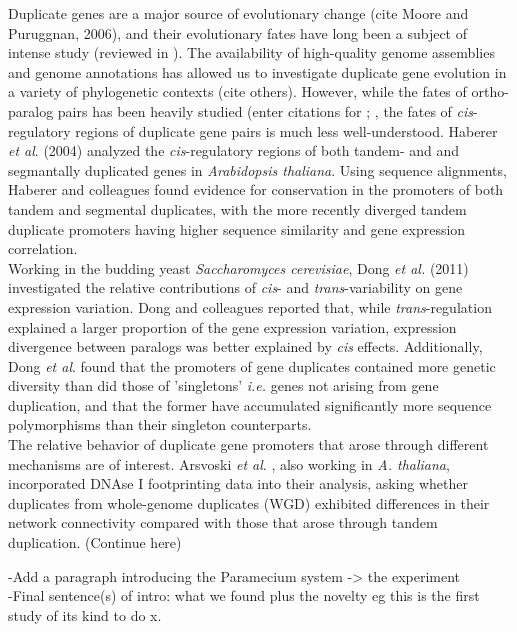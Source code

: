 \documentclass[nogrid]{MBE}%
\begin{document}
Duplicate genes are a major source of evolutionary change (cite \citep{Ohno.1970} Moore and Puruggnan, 2006), and their evolutionary fates have long been a subject of intense study (reviewed in \citep{Taylor.2004}). The availability of high-quality genome assemblies and genome annotations has allowed us to investigate duplicate gene evolution in a variety of phylogenetic contexts  \citep{Gu.2003} (cite others). However, while the fates of ortho-paralog pairs has been heavily studied (enter citations for \citep{Ohno.1970}; \citep{Wolfe.1997, Force.1999}, the fates of \textit{cis}-regulatory regions of duplicate gene pairs is much less well-understood. Haberer \textit{et al}. (2004) analyzed the \textit{cis}-regulatory regions of both tandem- and and segmantally duplicated genes in \textit{Arabidopsis thaliana}. Using sequence alignments, Haberer and colleagues found evidence for conservation in the promoters of both tandem and segmental duplicates, with the more recently diverged tandem duplicate promoters having higher sequence similarity and gene expression correlation.\\

Working in the budding yeast \textit{Saccharomyces cerevisiae}, Dong \textit{et al.} (2011) investigated the relative contributions of \textit{cis}- and \textit{trans}-variability on gene expression variation. Dong and colleagues reported that, while \textit{trans}-regulation explained a larger proportion of the gene expression variation, expression divergence between paralogs was better explained by \textit{cis} effects. Additionally, Dong \textit{et al}. found that the promoters of gene duplicates contained more genetic diversity than did those of 'singletons' \textit{i.e.} genes not arising from gene duplication, and that the former have accumulated significantly more sequence polymorphisms than their singleton counterparts.\\

The relative behavior of duplicate gene promoters that arose through different mechanisms are of interest. Arsvoski \textit{et al}. \citep{Arsovski.2015}, also working in \textit{A. thaliana}, incorporated DNAse I footprinting data into their analysis, asking whether duplicates from whole-genome duplicates (WGD) exhibited differences in their network connectivity compared with those that arose through tandem duplication. (Continue here) 

-Add a paragraph introducing the Paramecium system -> the experiment\\
-Final sentence(s) of intro: what we found plus the novelty eg this is the first study of its kind to do x.
\end{document}
